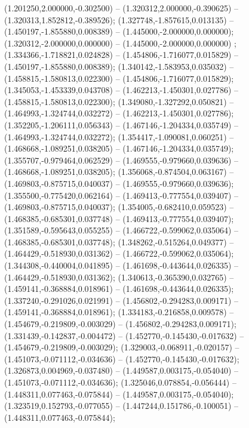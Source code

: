  (1.201250,2.000000,-0.302500) -- (1.320312,2.000000,-0.390625) -- (1.320313,1.852812,-0.389526);
 (1.327748,-1.857615,0.013135) -- (1.450197,-1.855880,0.008389) -- (1.445000,-2.000000,0.000000);
 (1.320312,-2.000000,0.000000) -- (1.445000,-2.000000,0.000000) ;
 (1.334366,-1.718821,0.024828) -- (1.454806,-1.716077,0.015829) -- (1.450197,-1.855880,0.008389);
 (1.340142,-1.583953,0.035032) -- (1.458815,-1.580813,0.022300) -- (1.454806,-1.716077,0.015829);
 (1.345053,-1.453339,0.043708) -- (1.462213,-1.450301,0.027786) -- (1.458815,-1.580813,0.022300);
 (1.349080,-1.327292,0.050821) -- (1.464993,-1.324744,0.032272) -- (1.462213,-1.450301,0.027786);
 (1.352205,-1.206111,0.056343) -- (1.467146,-1.204334,0.035749) -- (1.464993,-1.324744,0.032272);
 (1.354417,-1.090081,0.060251) -- (1.468668,-1.089251,0.038205) -- (1.467146,-1.204334,0.035749);
 (1.355707,-0.979464,0.062529) -- (1.469555,-0.979660,0.039636) -- (1.468668,-1.089251,0.038205);
 (1.356068,-0.874504,0.063167) -- (1.469803,-0.875715,0.040037) -- (1.469555,-0.979660,0.039636);
 (1.355500,-0.775420,0.062164) -- (1.469413,-0.777554,0.039407) -- (1.469803,-0.875715,0.040037);
 (1.354005,-0.682410,0.059523) -- (1.468385,-0.685301,0.037748) -- (1.469413,-0.777554,0.039407);
 (1.351589,-0.595643,0.055255) -- (1.466722,-0.599062,0.035064) -- (1.468385,-0.685301,0.037748);
 (1.348262,-0.515264,0.049377) -- (1.464429,-0.518930,0.031362) -- (1.466722,-0.599062,0.035064);
 (1.344308,-0.440004,0.041895) -- (1.461698,-0.443644,0.026335) -- (1.464429,-0.518930,0.031362);
 (1.340613,-0.365390,0.032765) -- (1.459141,-0.368884,0.018961) -- (1.461698,-0.443644,0.026335);
 (1.337240,-0.291026,0.021991) -- (1.456802,-0.294283,0.009171) -- (1.459141,-0.368884,0.018961);
 (1.334183,-0.216858,0.009578) -- (1.454679,-0.219809,-0.003029) -- (1.456802,-0.294283,0.009171);
 (1.331439,-0.142837,-0.004472) -- (1.452770,-0.145430,-0.017632) -- (1.454679,-0.219809,-0.003029);
 (1.329003,-0.068911,-0.020157) -- (1.451073,-0.071112,-0.034636) -- (1.452770,-0.145430,-0.017632);
 (1.326873,0.004969,-0.037480) -- (1.449587,0.003175,-0.054040) -- (1.451073,-0.071112,-0.034636);
 (1.325046,0.078854,-0.056444) -- (1.448311,0.077463,-0.075844) -- (1.449587,0.003175,-0.054040);
 (1.323519,0.152793,-0.077055) -- (1.447244,0.151786,-0.100051) -- (1.448311,0.077463,-0.075844);
